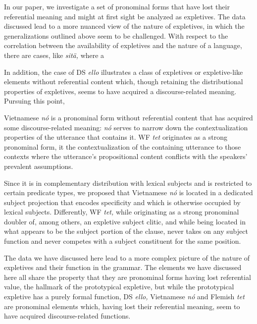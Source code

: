 \documentclass[output=paper]{LSP/langsci}
\begin{document}
In our paper, we investigate a set of pronominal forms that have lost their referential meaning and might at first sight be analyzed as expletives. The data discussed lead to a more nuanced view of the nature of expletives, in which the generalizations outlined above seem to be challenged. With respect to the correlation between the availability of expletives and the  nature of a language, there are cases, like  \textit{sitä}\textit{,} where a 

In addition, the case of DS \textit{ello} illustrates a class of expletives or expletive-like elements without referential content which, though retaining the distributional properties of expletives, seems to have acquired a discourse-related meaning. Pursuing this point, 

Vietnamese \textit{nó} is a pronominal form without referential content that has acquired some discourse-related meaning: \textit{nó} serves to narrow down the contextualization properties of the utterance that contains it. WF \textit{tet} originates as a strong pronominal form, it  the contextualization of the containing utterance to those contexts where the utterance’s propositional content conflicts with the speakers’ prevalent assumptions.

Since it is in complementary distribution with lexical subjects and is restricted to certain predicate types, we proposed that Vietnamese \textit{nó} is located in a dedicated subject projection that encodes specificity and which is otherwise occupied by lexical subjects. Differently, WF \textit{tet,} while originating as a strong pronominal doubler of, among others, an expletive subject clitic, and while being located in what appears to be the subject portion of the clause, never takes on any subject function and never competes with a subject constituent for the same position.     

The data we have discussed here lead to a more complex picture of the nature of expletives and their function in the grammar. The elements we have discussed here all share the property that they are pronominal forms having lost referential value, the hallmark of the prototypical expletive, but while the prototypical expletive has a purely formal function, DS \textit{ello,} Vietnamese \textit{nó} and Flemish \textit{tet} are pronominal elements which, having lost their referential meaning, seem to have acquired discourse-related functions.
\end{document}
